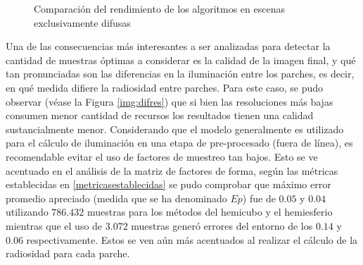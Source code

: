 \begin{figure}
\caption{Comparación del rendimiento de los algoritmos en escenas exclusivamente difusas}
\label{plot:emglc1}
\end{figure}

Una de las consecuencias más interesantes a ser analizadas para detectar la cantidad de muestras óptimas a considerar es la calidad de la imagen final, y qué tan pronunciadas son las diferencias en la iluminación entre los parches, es decir, en qué medida difiere la radiosidad entre parches. Para este caso, se pudo observar (véase la Figura \ref{img:difres}) que si bien las resoluciones más bajas consumen menor cantidad de recursos los resultados tienen una calidad sustancialmente menor. Considerando que el modelo generalmente es utilizado para el cálculo de iluminación en una etapa de pre-procesado (fuera de línea), es recomendable evitar el uso de factores de muestreo tan bajos. Esto se ve acentuado en el análisis de la matriz de factores de forma, según las métricas establecidas en \ref{metricasestablecidas} se pudo comprobar que máximo error promedio apreciado (medida que se ha denominado $Ep$) fue de $0.05$ y $0.04$ utilizando $786.432$ muestras para los métodos del hemicubo y el hemiesferio mientras que el uso de $3.072$ muestras generó errores del entorno de los $0.14$ y $0.06$ respectivamente. Estos se ven aún más acentuados al realizar el cálculo de la radiosidad para cada parche.

